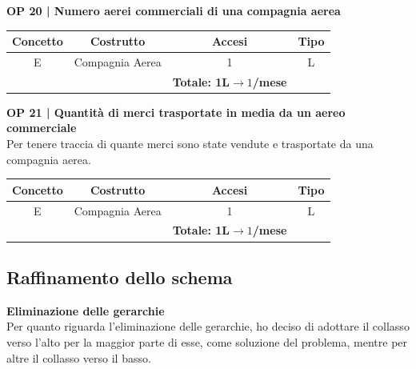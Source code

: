 \textbf{\small OP 20 | Numero aerei commerciali di una compagnia aerea}\\

\begin{tabular}{ c c c c}
	\hline
	\textbf{Concetto} & \textbf{Costrutto} & \textbf{Accesi} & \textbf{Tipo}\\
	\hline
	\textsf{\small E} & \textsf{\small Compagnia Aerea} & \textsf{\small 1} &  \textsf{\small L}\\
	\hline
	\textsf{\small } & \textsf{\small } & \textbf{Totale: 1L$\rightarrow 1$/mese } \textsf{\small } & \textsf{\small }\\
	\hline
\end{tabular}

\vspace{.6cm}


\textbf{\small OP 21 | Quantità di merci trasportate in media da un aereo commerciale}\\

\textsf{\small Per tenere traccia di quante merci sono state vendute e trasportate da una compagnia aerea.}\break

\begin{tabular}{ c c c c}
	\hline
	\textbf{Concetto} & \textbf{Costrutto} & \textbf{Accesi} & \textbf{Tipo}\\
	\hline
	\textsf{\small E} & \textsf{\small Compagnia Aerea} & \textsf{\small 1} &  \textsf{\small L}\\
	\hline
	\textsf{\small } & \textsf{\small } & \textbf{Totale: 1L$\rightarrow 1$/mese } \textsf{\small } & \textsf{\small }\\
	\hline
\end{tabular}


\newpage

\subsection{Raffinamento dello schema}

\textbf{Eliminazione delle gerarchie}\\
\textsf{\small Per quanto riguarda l'eliminazione delle gerarchie, ho deciso di adottare il collasso verso l'alto per la maggior parte di esse, come soluzione del problema, mentre per altre il collasso verso il basso.}\break 

